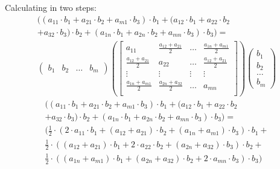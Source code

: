 \documentclass[12pt]{article}
\begin{document}
\begin{enumerate}
    Calculating in two steps:
    \begin{align*}
        ((a_{11} \cdot b_{1} + a_{21} \cdot b_{2} + a_{m1} \cdot b_{3}) \cdot b_{1} + (a_{12} \cdot b_{1} + a_{22} \cdot b_{2} \\
        + a_{32} \cdot b_{3}) \cdot b_{2} + (a_{1n} \cdot b_{1} + a_{2n} \cdot b_{2} + a_{mn} \cdot b_{3}) \cdot b_{3}) = \\
        \begin{pmatrix}
            b_1     &
            b_2     &
            \dots  &
            b_m
        \end{pmatrix} 
        (\begin{bmatrix}
            a_{11}                       &   \frac{a_{12} + a_{21}}{2}    & \dots     &   \frac{a_{1n} + a_{m1}}{2}   \\
            \frac{a_{12} + a_{21}}{2}    &   a_{22}                       & \dots     &   \frac{a_{12} + a_{21}}{2}   \\
            \vdots                       &   \vdots                       & \vdots    &   \vdots                      \\   
            \frac{a_{1n} + a_{m1}}{2}    &   \frac{a_{2n} + a_{32}}{2}    & \dots     &   a_{mn}                      \\
        \end{bmatrix})
        \begin{pmatrix}
            b_1     \\
            b_2     \\
            \dots  \\
            b_m
        \end{pmatrix}
    \end{align*}
    \begin{align*}
        ((a_{11} \cdot b_{1} + a_{21} \cdot b_{2} + a_{m1} \cdot b_{3}) \cdot b_{1} + (a_{12} \cdot b_{1} + a_{22} \cdot b_{2} \\
        + a_{32} \cdot b_{3}) \cdot b_{2} + (a_{1n} \cdot b_{1} + a_{2n} \cdot b_{2} + a_{mn} \cdot b_{3}) \cdot b_{3}) = \\
        (\frac{1}{2} \cdot (2 \cdot a_{11} \cdot b_{1} + (a_{12} + a_{21}) \cdot b_{2} + (a_{1n} + a_{m1}) \cdot b_{3}) \cdot b_{1} + \\
        \frac{1}{2} \cdot ((a_{12} + a_{21}) \cdot b_{1} + 2 \cdot a_{22} \cdot b_{2} + (a_{2n} + a_{32}) \cdot b_{3}) \cdot b_{2} + \\ 
        \frac{1}{2} \cdot ((a_{1n} + a_{m1}) \cdot b_{1} + (a_{2n} + a_{32}) \cdot b_{2} + 2 \cdot a_{mn} \cdot b_{3}) \cdot b_{3})
    \end{align*}


\end{enumerate}
\end{document}
